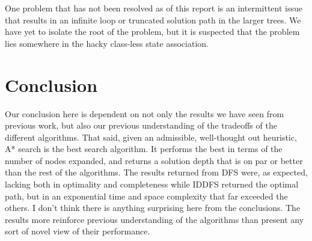 \documentclass[journal]{IEEEtran}
\begin{document}
\noindent One problem that has not been resolved as of this report is an intermittent
issue that results in an infinite loop or truncated solution path in the larger trees.
We have yet to isolate the root of the problem, but it is suspected that the problem
lies somewhere in the hacky class-less state association. \\



\section{Conclusion}
\noindent Our conclusion here is dependent on not only the results we have seen from previous
work, but also our previous understanding of the tradeoffs of the different algorithms. That said, given an
admissible, well-thought out heuristic, A* search is the best search algorithm. It
performs the best in terms of the number of nodes expanded, and returns a solution
depth that is on par or better than the rest of the algorithms. The results returned
from DFS were, as expected, lacking both in optimality and completeness while IDDFS
returned the optimal path, but in an exponential time and space complexity that far exceeded
the others. I don't think there is anything surprising here from the conclusions. The
results more reinforce previous understanding of the algorithms than present any sort of
novel view of their performance. \\
\end{document}
